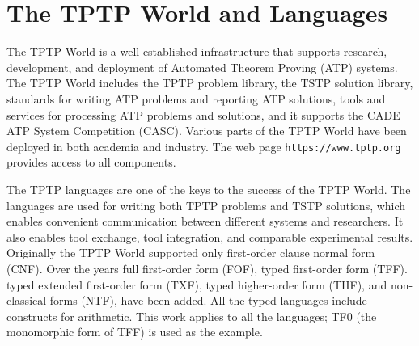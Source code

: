 \documentclass[letterpaper]{article}
\newcommand{\smalltt}[1]{\small \texttt{#1}}
\begin{document}
\section{The TPTP World and Languages}
\label{TPTP}

The TPTP World \cite{Sut17} is a well established infrastructure that supports research, 
development, and deployment of Automated Theorem Proving (ATP) systems.
The TPTP World includes the TPTP problem library,
the TSTP solution library,
standards for writing ATP problems and reporting ATP solutions,
tools and services for processing ATP problems and solutions,
and it supports the CADE ATP System Competition (CASC).
Various parts of the TPTP World have been deployed 
in both academia and industry.
The web page {\smalltt{https://www.tptp.org}} provides access to all components.

The TPTP languages \cite{Sut22-IGPL} are one of the keys to the success of the TPTP World.
The languages are used for writing both TPTP problems and TSTP solutions, which enables convenient 
communication between different systems and researchers. 
It also enables tool exchange, tool integration, and comparable experimental results.
Originally the TPTP World supported only first-order clause normal form (CNF).
Over the years full first-order form (FOF),
typed first-order form (TFF).
typed extended first-order form (TXF),
typed higher-order form (THF),
and non-classical forms (NTF),
have been added.
All the typed languages include constructs for arithmetic.
This work applies to all the languages; TF0 (the monomorphic form of TFF) \cite{SS+12} 
is used as the example.
\end{document}
